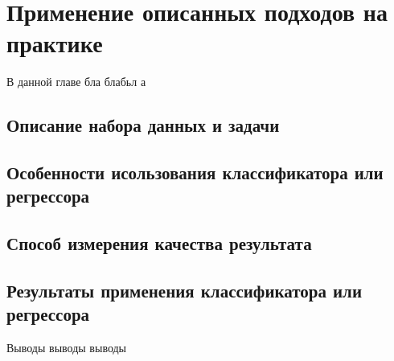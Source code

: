 \chapter{Применение описанных подходов на практике}

В данной главе бла блабьл а

\section{Описание набора данных и задачи}

\section{Особенности исользования классификатора или регрессора}

\section{Способ измерения качества результата}

\section{Результаты применения классификатора или регрессора}

\chapterconclusion

Выводы выводы выводы
